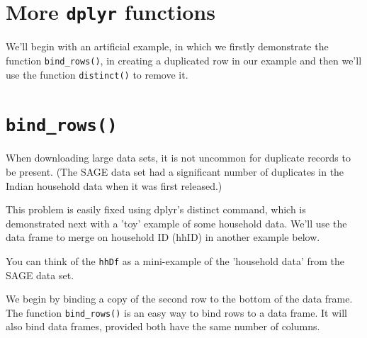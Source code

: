 \documentclass[titlepage]{book}\usepackage{knitr}
\begin{document}
\section{More \texttt{dplyr} functions }

We'll begin with an artificial example, in which we firstly demonstrate the function \texttt{bind\_rows()}, in creating a duplicated  row in our example and then we'll use the function \texttt{distinct()} to remove it.


\section{\texttt{bind\_rows()}} 

When downloading large data sets, it is not uncommon for duplicate records to be present. (The SAGE data set had a significant number of duplicates in the Indian household data when it was first released.) 

This problem is easily fixed using dplyr's distinct command, which is demonstrated next with a 'toy' example of some household data. We'll use the data frame to merge on household ID (hhID) in another example below.

\begin{knitrout}
\color{fgcolor}\begin{kframe}
\begin{alltt}

 \hlkwb{<-} \hlopt{:}
 \hlkwb{<-} \hlstd{(}\hlstd{,} \hlstd{,} \hlstd{,} \hlstd{)}
 \hlkwb{<-} \hlstd{letters[}\hlopt{:}\hlstd{]}
 \hlkwb{<-} \hlstd{(} \hlstd{=} 
                    
                    
\end{alltt}
\end{kframe}
\end{knitrout}

You can think of the \texttt{hhDf} as a mini-example of the 'household data' from the SAGE data set.

We begin by binding a copy of the second row to the bottom of the data frame. The function \texttt{bind\_rows()} is an easy way to bind rows to a data frame. It will also bind data frames, provided both have the same number of columns.
\end{document}
